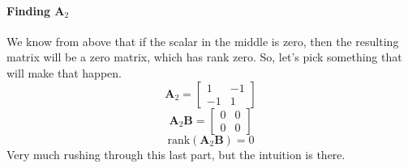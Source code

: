 \documentclass{article}
\begin{document}
                \paragraph{Finding $\mathbf{A}_2$}
                    We know from above that if the scalar in the middle is zero,
                    then the resulting matrix will be a zero matrix, which has rank zero.
                    So, let's pick something that will make that happen.
                    \[
                        \mathbf{A}_2=\begin{bmatrix}1&-1\\-1&1\end{bmatrix}
                    \]
                    \[
                        \mathbf{A}_2\mathbf{B}=\begin{bmatrix}0&0\\0&0\end{bmatrix}
                    \]
                    \[
                        \text{rank}(\mathbf{A}_2\mathbf{B})=0
                    \]
            Very much rushing through this last part, but the intuition is there.
\end{document}
